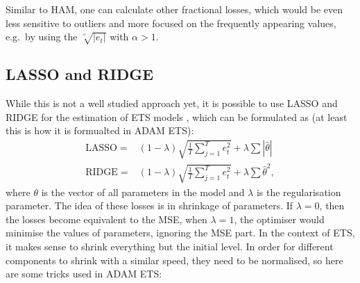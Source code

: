 \documentclass[
]{book}
\theoremstyle{definition}
\theoremstyle{definition}
\theoremstyle{definition}
\theoremstyle{definition}
\theoremstyle{remark}
\begin{document}
Similar to HAM, one can calculate other fractional losses, which would be even less sensitive to outliers and more focused on the frequently appearing values, e.g.~by using the \(\sqrt[^\alpha]{\left|e_t\right|}\) with \(\alpha>1\).

\hypertarget{lasso-and-ridge}{%
\subsection{LASSO and RIDGE}\label{lasso-and-ridge}}

While this is not a well studied approach yet, it is possible to use LASSO \citep{Tibshirani1996} and RIDGE for the estimation of ETS models \citep[ give a good overview of these losses with examples in R]{James2017}, which can be formulated as (at least this is how it is formualted in ADAM ETS):
\begin{equation}
  \begin{aligned}
    \mathrm{LASSO} = &(1-\lambda) \sqrt{\frac{1}{T} \sum_{j=1}^T e_t^2} + \lambda \sum |\hat{\theta}| \\
    \mathrm{RIDGE} = &(1-\lambda) \sqrt{\frac{1}{T} \sum_{j=1}^T e_t^2} + \lambda \sum \hat{\theta}^2,
  \end{aligned}
  \label{eq:Regularisation}
\end{equation}
where \(\theta\) is the vector of all parameters in the model and \(\lambda\) is the regularisation parameter. The idea of these losses is in shrinkage of parameters. If \(\lambda=0\), then the losses become equivalent to the MSE, when \(\lambda=1\), the optimiser would minimise the values of parameters, ignoring the MSE part. In the context of ETS, it makes sense to shrink everything but the initial level. In order for different components to shrink with a similar speed, they need to be normalised, so here are some tricks used in ADAM ETS:
\end{document}
